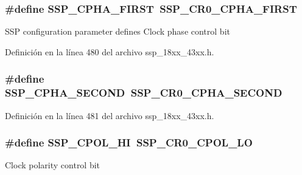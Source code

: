 \subsubsection[{\texorpdfstring{S\+S\+P\+\_\+\+C\+P\+H\+A\+\_\+\+F\+I\+R\+ST}{SSP_CPHA_FIRST}}]{\setlength{\rightskip}{0pt plus 5cm}\#define S\+S\+P\+\_\+\+C\+P\+H\+A\+\_\+\+F\+I\+R\+ST~{\bf S\+S\+P\+\_\+\+C\+R0\+\_\+\+C\+P\+H\+A\+\_\+\+F\+I\+R\+ST}}\hypertarget{group___s_s_p__18_x_x__43_x_x_ga6333b5eaf9d5301431fc0399c0d417d5}{}\label{group___s_s_p__18_x_x__43_x_x_ga6333b5eaf9d5301431fc0399c0d417d5}
S\+SP configuration parameter defines Clock phase control bit 

Definición en la línea 480 del archivo ssp\+\_\+18xx\+\_\+43xx.\+h.

\subsubsection[{\texorpdfstring{S\+S\+P\+\_\+\+C\+P\+H\+A\+\_\+\+S\+E\+C\+O\+ND}{SSP_CPHA_SECOND}}]{\setlength{\rightskip}{0pt plus 5cm}\#define S\+S\+P\+\_\+\+C\+P\+H\+A\+\_\+\+S\+E\+C\+O\+ND~{\bf S\+S\+P\+\_\+\+C\+R0\+\_\+\+C\+P\+H\+A\+\_\+\+S\+E\+C\+O\+ND}}\hypertarget{group___s_s_p__18_x_x__43_x_x_ga04ad38295445819979f55503eed5c177}{}\label{group___s_s_p__18_x_x__43_x_x_ga04ad38295445819979f55503eed5c177}


Definición en la línea 481 del archivo ssp\+\_\+18xx\+\_\+43xx.\+h.

\subsubsection[{\texorpdfstring{S\+S\+P\+\_\+\+C\+P\+O\+L\+\_\+\+HI}{SSP_CPOL_HI}}]{\setlength{\rightskip}{0pt plus 5cm}\#define S\+S\+P\+\_\+\+C\+P\+O\+L\+\_\+\+HI~{\bf S\+S\+P\+\_\+\+C\+R0\+\_\+\+C\+P\+O\+L\+\_\+\+LO}}\hypertarget{group___s_s_p__18_x_x__43_x_x_gaf64aec37a92ca6c14c23af6fc0052ccb}{}\label{group___s_s_p__18_x_x__43_x_x_gaf64aec37a92ca6c14c23af6fc0052ccb}
Clock polarity control bit 

